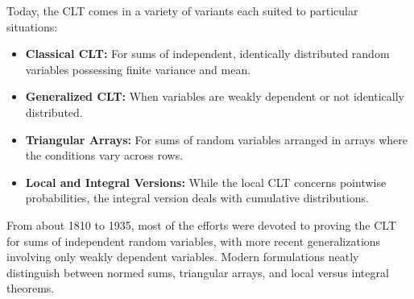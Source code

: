  
Today, the CLT comes in a variety of variants each suited to particular situations:
\begin{itemize}
    \item \textbf{Classical CLT:} For sums of independent, identically distributed random variables possessing finite variance and mean.
    \item \textbf{Generalized CLT:} When variables are weakly dependent or not identically distributed.
    \item \textbf{Triangular Arrays:} For sums of random variables arranged in arrays where the conditions vary across rows.
    \item \textbf{Local and Integral Versions:} While the local CLT concerns pointwise probabilities, the integral version deals with cumulative distributions.
\end{itemize}
From about 1810 to 1935, most of the efforts were devoted to proving the CLT for sums of independent random variables, with more recent generalizations involving only weakly dependent variables. Modern formulations neatly distinguish between normed sums, triangular arrays, and local versus integral theorems.
